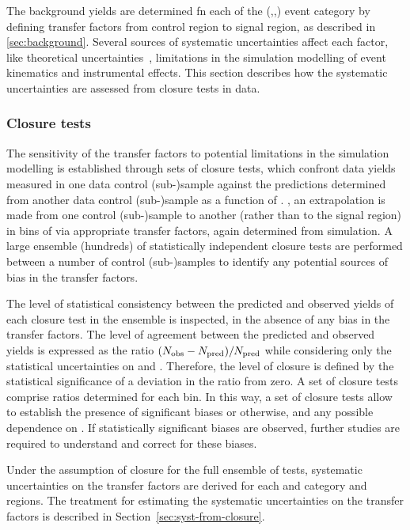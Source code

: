 The background yields are determined fn each of the (\nb,\njet,\HT) event category 
by defining transfer factors from control region to signal region, as described in \ref{sec:background}. 
Several sources of systematic uncertainties affect each factor, like 
theoretical uncertainties~\cite{Bern:2011pa}, 
limitations in the simulation modelling of event kinematics and
instrumental effects. This section describes how the systematic
uncertainties are assessed from closure tests in data.

\subsubsection{Closure tests\label{sec:closure-tests-desc}}

The sensitivity of the transfer factors to potential limitations in
the simulation modelling is established through sets of closure tests,
which confront data yields measured in one data control (sub-)sample
against the predictions determined from another data control
(sub-)sample as a function of \scalht. \ie, an extrapolation is made
from one control (sub-)sample to another (rather than to the signal
region) in bins of \scalht via appropriate transfer factors, again
determined from simulation. A large ensemble (\ie hundreds) of
statistically independent closure tests are performed between a number
of control (sub-)samples to identify any potential sources of bias in
the transfer factors.

The level of statistical consistency between the predicted and
observed yields of each closure test in the ensemble is inspected, in
the absence of any bias in the transfer factors. The level of
agreement between the predicted and observed yields is expressed as
the ratio $(\nobs - \npre)/\npre$ while considering only the
statistical uncertainties on \npre and \nobs. Therefore, the level of
closure is defined by the statistical significance of a deviation in
the ratio from zero. A set of closure tests comprise ratios determined
for each \scalht bin. In this way, a set of closure tests allow to
establish the presence of significant biases or otherwise, and any
possible dependence on \scalht. If statistically significant biases
are observed, further studies are required to understand and correct
for these biases.

Under the assumption of closure for the full ensemble of tests,
systematic uncertainties on the transfer factors are derived for each
\njet and \nb category and \scalht regions. The treatment for
estimating the systematic uncertainties on the transfer factors is
described in Section~\ref{sec:syst-from-closure}.

